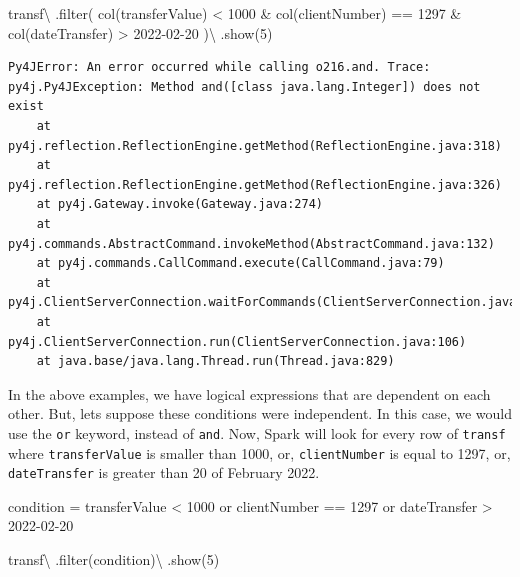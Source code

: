 \documentclass[
  11pt,
  letterpaper,
  DIV=11,
  numbers=noendperiod]{scrreprt}
\newenvironment{Shaded}{\begin{snugshade}}{\end{snugshade}}
\newcommand{\BuiltInTok}[1]{\textcolor[rgb]{0.00,0.23,0.31}{#1}}
\newcommand{\DecValTok}[1]{\textcolor[rgb]{0.68,0.00,0.00}{#1}}
\newcommand{\NormalTok}[1]{\textcolor[rgb]{0.00,0.23,0.31}{#1}}
\newcommand{\OperatorTok}[1]{\textcolor[rgb]{0.37,0.37,0.37}{#1}}
\newcommand{\StringTok}[1]{\textcolor[rgb]{0.13,0.47,0.30}{#1}}
\begin{document}
\begin{Shaded}
\begin{Highlighting}[]
\NormalTok{transf}\OperatorTok{\textbackslash{}}
\NormalTok{  .}\BuiltInTok{filter}\NormalTok{(}
\NormalTok{    col(}\StringTok{\textquotesingle{}transferValue\textquotesingle{}}\NormalTok{) }\OperatorTok{\textless{}} \DecValTok{1000} \OperatorTok{\&}
\NormalTok{    col(}\StringTok{\textquotesingle{}clientNumber\textquotesingle{}}\NormalTok{) }\OperatorTok{==} \DecValTok{1297} \OperatorTok{\&}
\NormalTok{    col(}\StringTok{\textquotesingle{}dateTransfer\textquotesingle{}}\NormalTok{) }\OperatorTok{\textgreater{}} \StringTok{\textquotesingle{}2022{-}02{-}20\textquotesingle{}}
\NormalTok{  )}\OperatorTok{\textbackslash{}}
\NormalTok{  .show(}\DecValTok{5}\NormalTok{)}
\end{Highlighting}
\end{Shaded}

\begin{verbatim}
Py4JError: An error occurred while calling o216.and. Trace:
py4j.Py4JException: Method and([class java.lang.Integer]) does not exist
    at py4j.reflection.ReflectionEngine.getMethod(ReflectionEngine.java:318)
    at py4j.reflection.ReflectionEngine.getMethod(ReflectionEngine.java:326)
    at py4j.Gateway.invoke(Gateway.java:274)
    at py4j.commands.AbstractCommand.invokeMethod(AbstractCommand.java:132)
    at py4j.commands.CallCommand.execute(CallCommand.java:79)
    at py4j.ClientServerConnection.waitForCommands(ClientServerConnection.java:182)
    at py4j.ClientServerConnection.run(ClientServerConnection.java:106)
    at java.base/java.lang.Thread.run(Thread.java:829)
\end{verbatim}

In the above examples, we have logical expressions that are dependent on
each other. But, lets suppose these conditions were independent. In this
case, we would use the \texttt{or} keyword, instead of \texttt{and}.
Now, Spark will look for every row of \texttt{transf} where
\texttt{transferValue} is smaller than 1000, or, \texttt{clientNumber}
is equal to 1297, or, \texttt{dateTransfer} is greater than 20 of
February 2022.

\begin{Shaded}
\begin{Highlighting}[]
\NormalTok{condition }\OperatorTok{=} \StringTok{\textquotesingle{}\textquotesingle{}\textquotesingle{}}
\StringTok{  transferValue \textless{} 1000}
\StringTok{  or clientNumber == 1297 }
\StringTok{  or dateTransfer \textgreater{} \textquotesingle{}2022{-}02{-}20\textquotesingle{}}
\StringTok{\textquotesingle{}\textquotesingle{}\textquotesingle{}}

\NormalTok{transf}\OperatorTok{\textbackslash{}}
\NormalTok{  .}\BuiltInTok{filter}\NormalTok{(condition)}\OperatorTok{\textbackslash{}}
\NormalTok{  .show(}\DecValTok{5}\NormalTok{)}
\end{Highlighting}
\end{Shaded}
\end{document}
